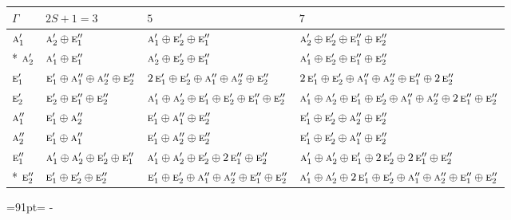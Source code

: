 \documentclass[10pt,a4paper]{article}
\newcommand{\needspace}[1]{\par\penalty-100\begingroup\dimen0=#1\relax\dimen2=\pagegoal
  \advance\dimen2-\pagetotal\ifdim\dimen0>\dimen2\relax\ifdim\dimen2>0pt\vfil\break\fi\fi
  \endgroup}
\numberwithin{equation}{section}
\newcommand{\irr}[1]{\text{\normalfont\scshape #1}}
\begin{document}
{\small\setlength{\tabcolsep}{3pt}\begin{longtable}{@{}l>{\RaggedRight\arraybackslash}p{}>{\RaggedRight\arraybackslash}p{}>{\RaggedRight\arraybackslash}p{}@{}}\toprule
$\Gamma$ & $2S + 1 = 3$ & $5$ & $7$\\\midrule\endhead
\bottomrule\endfoot\endlastfoot
$\irr{a}_{1}'$ & $\irr{a}_{2}'\oplus \irr{e}_{1}''$ & $\irr{a}_{1}'\oplus \irr{e}_{2}'\oplus \irr{e}_{1}''$ & $\irr{a}_{2}'\oplus \irr{e}_{2}'\oplus \irr{e}_{1}''\oplus \irr{e}_{2}''$\\*
$\irr{a}_{2}'$ & $\irr{a}_{1}'\oplus \irr{e}_{1}''$ & $\irr{a}_{2}'\oplus \irr{e}_{2}'\oplus \irr{e}_{1}''$ & $\irr{a}_{1}'\oplus \irr{e}_{2}'\oplus \irr{e}_{1}''\oplus \irr{e}_{2}''$\\
$\irr{e}_{1}'$ & $\irr{e}_{1}'\oplus \irr{a}_{1}''\oplus \irr{a}_{2}''\oplus \irr{e}_{2}''$ & $2\,\irr{e}_{1}'\oplus \irr{e}_{2}'\oplus \irr{a}_{1}''\oplus \irr{a}_{2}''\oplus \irr{e}_{2}''$ & $2\,\irr{e}_{1}'\oplus \irr{e}_{2}'\oplus \irr{a}_{1}''\oplus \irr{a}_{2}''\oplus \irr{e}_{1}''\oplus 2\,\irr{e}_{2}''$\\
$\irr{e}_{2}'$ & $\irr{e}_{2}'\oplus \irr{e}_{1}''\oplus \irr{e}_{2}''$ & $\irr{a}_{1}'\oplus \irr{a}_{2}'\oplus \irr{e}_{1}'\oplus \irr{e}_{2}'\oplus \irr{e}_{1}''\oplus \irr{e}_{2}''$ & $\irr{a}_{1}'\oplus \irr{a}_{2}'\oplus \irr{e}_{1}'\oplus \irr{e}_{2}'\oplus \irr{a}_{1}''\oplus \irr{a}_{2}''\oplus 2\,\irr{e}_{1}''\oplus \irr{e}_{2}''$\\
$\irr{a}_{1}''$ & $\irr{e}_{1}'\oplus \irr{a}_{2}''$ & $\irr{e}_{1}'\oplus \irr{a}_{1}''\oplus \irr{e}_{2}''$ & $\irr{e}_{1}'\oplus \irr{e}_{2}'\oplus \irr{a}_{2}''\oplus \irr{e}_{2}''$\\
$\irr{a}_{2}''$ & $\irr{e}_{1}'\oplus \irr{a}_{1}''$ & $\irr{e}_{1}'\oplus \irr{a}_{2}''\oplus \irr{e}_{2}''$ & $\irr{e}_{1}'\oplus \irr{e}_{2}'\oplus \irr{a}_{1}''\oplus \irr{e}_{2}''$\\
$\irr{e}_{1}''$ & $\irr{a}_{1}'\oplus \irr{a}_{2}'\oplus \irr{e}_{2}'\oplus \irr{e}_{1}''$ & $\irr{a}_{1}'\oplus \irr{a}_{2}'\oplus \irr{e}_{2}'\oplus 2\,\irr{e}_{1}''\oplus \irr{e}_{2}''$ & $\irr{a}_{1}'\oplus \irr{a}_{2}'\oplus \irr{e}_{1}'\oplus 2\,\irr{e}_{2}'\oplus 2\,\irr{e}_{1}''\oplus \irr{e}_{2}''$\\*
$\irr{e}_{2}''$ & $\irr{e}_{1}'\oplus \irr{e}_{2}'\oplus \irr{e}_{2}''$ & $\irr{e}_{1}'\oplus \irr{e}_{2}'\oplus \irr{a}_{1}''\oplus \irr{a}_{2}''\oplus \irr{e}_{1}''\oplus \irr{e}_{2}''$ & $\irr{a}_{1}'\oplus \irr{a}_{2}'\oplus 2\,\irr{e}_{1}'\oplus \irr{e}_{2}'\oplus \irr{a}_{1}''\oplus \irr{a}_{2}''\oplus \irr{e}_{1}''\oplus \irr{e}_{2}''$\\
\bottomrule\end{longtable}}
\needspace{91pt}
\end{document}
